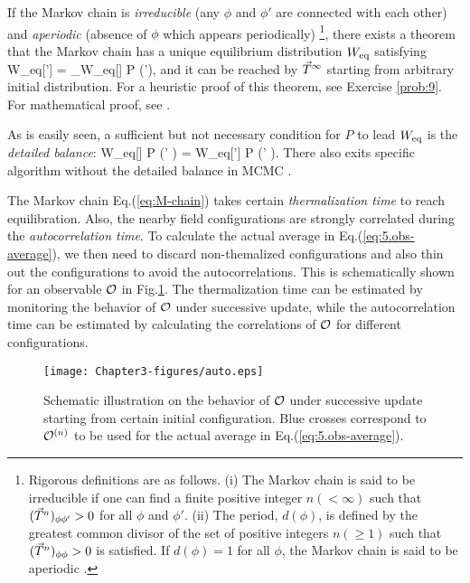 If  the Markov chain is {\it irreducible} (any $\phi$ and $\phi'$ are connected with each other) and  {\it aperiodic}
(absence of $\phi$ which appears periodically) \footnote{Rigorous definitions are as follows. (i) The Markov chain is said to be 
irreducible if one can find a finite positive integer $n (< \infty)$  such that  $(\vec{T}^n)_{\phi \phi'} > 0 $ for all $\phi$ and $\phi'$.
(ii)  The period, $d(\phi)$, is defined by the greatest common divisor  of the set of positive integers $n (\ge 1)$
such that  $(\vec{T}^n)_{\phi \phi} > 0 $ is satisfied. If $d(\phi)=1$ for all $\phi$, the Markov chain is 
said to be aperiodic \cite{Haggstrom:2002}.},  there exists a theorem that the Markov chain
 has a unique equilibrium distribution $W_{\rm eq}$ satisfying 
\beq
\label{eq:transition-W}
W_{\rm eq}[\phi']  =  \sum_\phi W_{\rm eq}[\phi] P (\phi \rightarrow \phi'),
\eeq
and it can be reached by $\vec{T}^{\infty}$ starting from arbitrary initial distribution.
For a heuristic proof of this theorem, see Exercise \ref{prob:9}. For mathematical proof,  see  \cite{Haggstrom:2002}.

As is easily seen, a  sufficient but not necessary condition for $P$ to lead $W_{\rm eq}$  is the {\it detailed balance}:
\beq
\label{eq:5.det-balance}
W_{\rm eq}[\phi] P (\phi \rightarrow \phi' )  =
 W_{\rm eq}[\phi'] P (\phi' \rightarrow \phi ).
\eeq
There also exits specific algorithm without the detailed balance in MCMC  \cite{SuwaTodo:2010}.


The Markov chain Eq.(\ref{eq:M-chain})  takes 
certain {\it thermalization time} to reach equilibration. 
Also, the nearby  field configurations  are strongly correlated  during the {\it autocorrelation time}.
To calculate the actual average in Eq.(\ref{eq:5.obs-average}), we then 
need to discard non-themalized configurations and also 
thin out the configurations to avoid the autocorrelations. 
This is schematically shown for an observable ${\cal O}$ in Fig.\ref{fig:auto}.
The thermalization time can be estimated by monitoring the behavior of ${\cal O}$  under 
successive update, while the autocorrelation time can be estimated by 
calculating the correlations of ${\cal O}$ for different configurations.

 
\begin{figure}[t]
\begin{center}
\texttt{[image: Chapter3-figures/auto.eps]} 
 \end{center}
\caption{Schematic illustration on the behavior of ${\cal O}$ under successive update starting from
certain initial configuration. Blue crosses correspond to ${\cal O}^{(n)}$ to be used for the actual average in
Eq.(\ref{eq:5.obs-average}).}
\label{fig:auto}
\end{figure}
    
